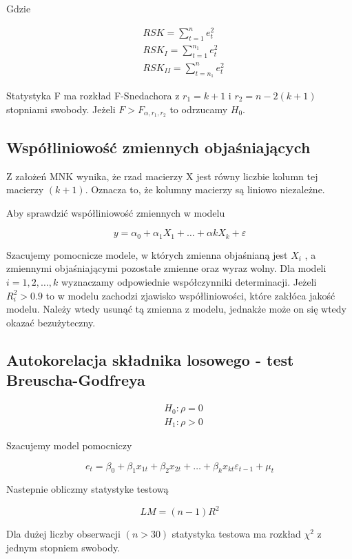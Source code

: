 Gdzie

\begin{equation}
    \begin{split}
        &RSK = \sum_{t=1}^{n} e_{t}^{2} \\
        &RSK_{I} = \sum_{t=1}^{n_1} e_{t}^{2} \\
        &RSK_{II} = \sum_{t=n_1}^{n} e_{t}^{2}
    \end{split}
\end{equation}

Statystyka F ma rozkład F-Snedachora z \(r_1=k+1 \) i \(r_2= n -2(k+1) \) stopniami swobody.
Jeżeli \( F > F_{\alpha,r_1,r_2} \) to odrzucamy \(H_{0}\).

\subsection{Współliniowość zmiennych objaśniających}\label{subsec:współliniowość-zmiennych-objaśniających}

Z założeń MNK wynika, że rzad macierzy X jest równy liczbie kolumn tej macierzy \((k+1)\).
Oznacza to, że kolumny macierzy są liniowo niezależne.

Aby sprawdzić współliniowość zmiennych w modelu

\begin{equation}
    y = \alpha_{0} + \alpha_{1}X_{1} + \dots + \alpha{k}X_{k} + \varepsilon
\end{equation}

Szacujemy pomocnicze modele, w których zmienna objaśnianą jest \(X_i\) , a zmiennymi objaśniającymi pozostałe zmienne oraz wyraz wolny.
Dla modeli \(i=1,2, \dots ,k \) wyznaczamy odpowiednie współczynniki determinacji.
Jeżeli \(R_{i}^{2} > 0.9\) to w modelu zachodzi zjawisko współliniowości, które zakłóca jakość modelu.
Należy wtedy usunąć tą zmienna z modelu, jednakże może on się wtedy okazać bezużyteczny.

\subsection{Autokorelacja składnika losowego - test Breuscha-Godfreya}\label{subsec:autokorelacja-składnika-losowego}

\begin{equation}
    \begin{split}
        &H_0: \rho = 0 \\
        &H_1: \rho > 0
    \end{split}
\end{equation}

Szacujemy model pomocniczy

\begin{equation}
    e_{t} = \beta_{0} + \beta_{1}x_{1t} + \beta_{2}x_{2t} + \dots + \beta_{k}x_{kt}\varepsilon_{t-1} + \mu_{t}
\end{equation}

Nastepnie obliczmy statystyke testową

\begin{equation}
    LM = (n-1)R^2
\end{equation}

Dla dużej liczby obserwacji \((n > 30)\) statystyka testowa ma rozkład \(\chi^2\) z jednym stopniem swobody.
